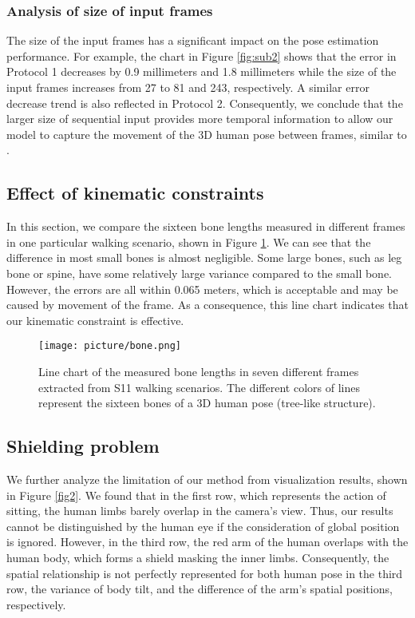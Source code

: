 \documentclass[runningheads]{llncs}
\begin{document}
\subsubsection{Analysis of size of input frames} The size of the input frames has a significant impact on the pose estimation performance. For example, the chart in Figure \ref{fig:sub2} shows that the error in Protocol 1 decreases by 0.9 millimeters and 1.8 millimeters while the size of the input frames increases from 27 to 81 and 243, respectively. A similar error decrease trend is also reflected in Protocol 2. Consequently, we conclude that the larger size of sequential input provides more temporal information to allow our model to capture the movement of the 3D human pose between frames, similar to \cite{temporal_convolutions_and_semi_supervised}.



\subsection{Effect of kinematic constraints} \label{kcloss_d}

In this section, we compare the sixteen bone lengths measured in different frames in one particular walking scenario, shown in Figure \ref{bones}. We can see that the difference in most small bones is almost negligible. Some large bones, such as leg bone or spine, have some relatively large variance compared to the small bone. However, the errors are all within 0.065 meters, which is acceptable and may be caused by movement of the frame. As a consequence, this line chart indicates that our kinematic constraint is effective.

\begin{figure}[!htp]
\texttt{[image: picture/bone.png]}
\caption{Line chart of the measured bone lengths in seven different frames extracted from S11 walking scenarios. The different colors of lines represent the sixteen bones of a 3D human pose (tree-like structure).} \label{bones}
\end{figure}


\subsection{Shielding problem}
We further analyze the limitation of our method from visualization results, shown in Figure \ref{fig2}. We found that in the first row, which represents the action of sitting, the human limbs barely overlap in the camera's view. Thus, our results cannot be distinguished by the human eye if the consideration of global position is ignored. However, in the third row, the red arm of the human overlaps with the human body, which forms a shield masking the inner limbs. Consequently, the spatial relationship is not perfectly represented for both human pose in the third row, the variance of body tilt, and the difference of the arm's spatial positions, respectively.
\end{document}
